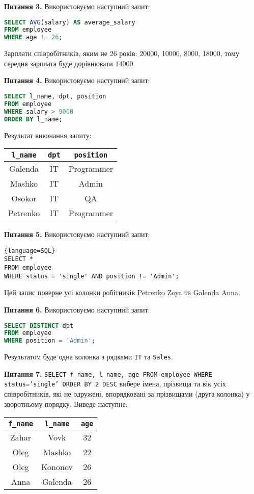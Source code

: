 \documentclass{hw_template}
\begin{document}
\textbf{Питання 3.} Використовуємо наступний запит:
\begin{lstlisting}[language=SQL]
SELECT AVG(salary) AS average_salary
FROM employee
WHERE age != 26;
\end{lstlisting}

Зарплати співробітників, яким не 26 років: 20000, 10000, 8000, 18000, тому
середня зарплата буде дорівнювати $14000$. 

\textbf{Питання 4.} Використовуємо наступний запит:
\begin{lstlisting}[language=SQL]
SELECT l_name, dpt, position
FROM employee
WHERE salary > 9000
ORDER BY l_name;
\end{lstlisting}

Результат виконання запиту:
\begin{table}[H]
    \centering
    \begin{tabular}{|c|c|c|}
        \hline
        \texttt{l\_name} & \texttt{dpt} & \texttt{position} \\
        \hline
        Galenda & IT & Programmer \\
        Mashko  & IT & Admin \\
        Osokor  & IT & QA \\
        Petrenko & IT & Programmer \\
        \hline
    \end{tabular}
\end{table}

\textbf{Питання 5.} Використовуємо наступний запит:
\begin{lstlisting}{language=SQL}
SELECT *
FROM employee
WHERE status = 'single' AND position != 'Admin';
\end{lstlisting}

Цей запис поверне усі колонки робітників Petrenko Zoya та Galenda Anna.

\textbf{Питання 6.} Використовуємо наступний запит:
\begin{lstlisting}[language=SQL]
SELECT DISTINCT dpt
FROM employee
WHERE position = 'Admin';
\end{lstlisting}

Результатом буде одна колонка з рядками \texttt{IT} та \texttt{Sales}.

\textbf{Питання 7.} \texttt{SELECT f\_name, l\_name, age FROM employee WHERE
status='single' ORDER BY 2 DESC} вибере імена, прізвища та вік усіх
співробітників, які не одружені, впорядковані за прізвищами (друга колонка) у
зворотньому порядку. Виведе наступне:
\begin{table}[H]
    \centering
    \begin{tabular}{|c|c|c|}
        \hline
        \texttt{f\_name} & \texttt{l\_name} & \texttt{age} \\
        \hline
        Zahar    & Vovk       & 32 \\
        Oleg     & Mashko     & 22 \\
        Oleg     & Kononov    & 26 \\
        Anna     & Galenda    & 26 \\
        \hline
    \end{tabular}
\end{table}
\end{document}
